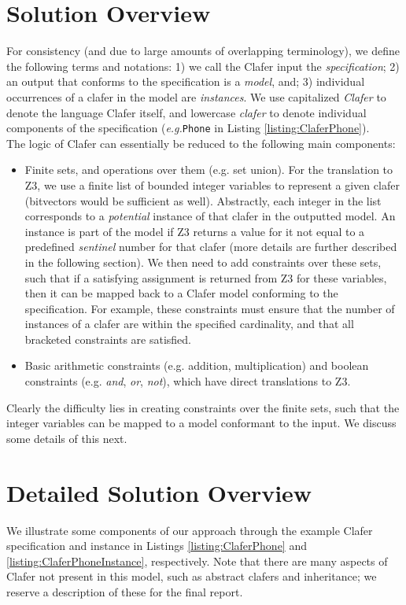\documentclass{article}
\newcommand{\eg}{\emph{e.g.}\xspace}
\begin{document}
\section{Solution Overview}
For consistency (and due to large amounts of overlapping terminology), we define the following terms and notations: 1) we call the Clafer input the \textit{specification}; 2) an output that conforms to the specification is a \textit{model}, and; 3) individual occurrences of a clafer in the model are \textit{instances}. We use capitalized \textit{Clafer} to denote the language Clafer itself, and lowercase \textit{clafer} to denote individual components of the specification (\eg \texttt{Phone} in Listing  \ref{listing:ClaferPhone}).\\
\indent The logic of Clafer can essentially be reduced to the following main components:
\begin{itemize}
\item Finite sets, and operations over them (e.g. set union). For the translation to Z3, we use a finite list of bounded integer variables to represent a given clafer (bitvectors would be sufficient as well). Abstractly, each integer in the list corresponds to a \textit{potential} instance of that clafer in the outputted model. An instance is part of the model if Z3 returns a value for it not equal to a predefined \textit{sentinel} number for that clafer (more details are further described in the following section). We then need to add constraints over these sets, such that if a satisfying assignment is returned from Z3 for these variables, then it can be mapped back to a Clafer model conforming to the specification. For example, these constraints must ensure that the number of instances of a clafer are within the specified cardinality, and that all bracketed constraints are satisfied.
\item Basic arithmetic constraints (e.g. addition, multiplication) and boolean constraints (e.g. \textit{and}, \textit{or}, \textit{not}), which have direct translations to Z3.
\end{itemize} 

Clearly the difficulty lies in creating constraints over the finite sets, such that the integer variables can be mapped to a model conformant to the input. We discuss some details of this next.

\section{Detailed Solution Overview}
We illustrate some components of our approach through the example Clafer specification and instance in Listings \ref{listing:ClaferPhone} and \ref{listing:ClaferPhoneInstance}, respectively. Note that there are many aspects of Clafer not present in this model, such as abstract clafers and inheritance; we reserve a description of these for the final report.
\end{document}
